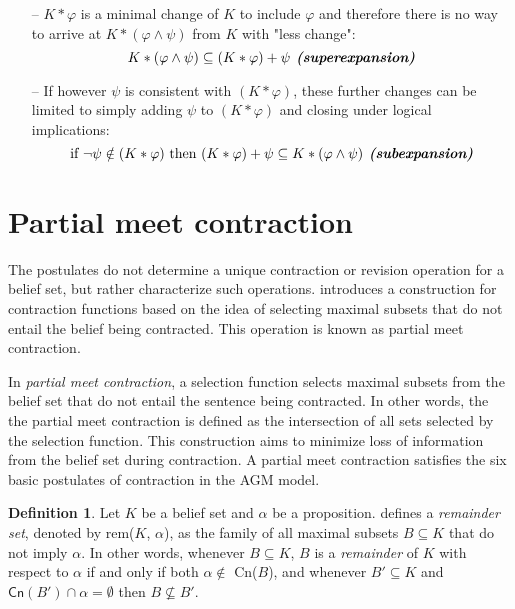\begin{enumerate}
    \item [--] $K * \varphi$ is a minimal change of $K$ to include $\varphi$ and therefore there is no way to arrive at $K * (\varphi \wedge \psi)$ from $K$ with "less change":
    $$K * (\varphi \wedge \psi) \subseteq (K * \varphi) + \psi \textbf{\textit{ (superexpansion)}}$$    
    
    \item [--] If however $\psi$ is consistent with $(K * \varphi)$, these further changes can be limited to simply adding $\psi$ to $(K * \varphi)$ and closing under logical implications:
    $$\text{if } \neg \psi \notin (K * \varphi) \text{ then } (K * \varphi) + \psi \subseteq K * (\varphi \wedge \psi) \textbf{\textit{ (subexpansion)}}$$

\end{enumerate}

\section{Partial meet contraction}

The postulates do not determine a unique contraction or revision operation for a belief set, but rather characterize such operations. \citet{AGM1985} introduces a construction for contraction functions based on the idea of selecting maximal subsets that do not entail the belief being contracted. This operation is known as partial meet contraction.

In \textit{partial meet contraction}, a selection function selects maximal subsets from the belief set that do not entail the sentence being contracted. In other words, the the partial meet contraction is defined as the intersection of all sets selected by the selection function. This construction aims to minimize loss of information from the belief set during contraction. A partial meet contraction satisfies the six basic postulates of contraction in the AGM model.

\theoremstyle{definition}
\newtheorem{definition}{Definition}[chapter]

\begin{definition}
    Let $K$ be a belief set and $\alpha$ be a proposition. \citet{AM1981} defines a \textit{remainder set}, denoted by \textsf{rem}($K$, $\alpha$), as the family of all maximal subsets $B \subseteq K$ that do not imply $\alpha$. In other words, whenever $B \subseteq K$, $B$ is a \textit{remainder} of $K$ with respect to $\alpha$ if and only if both $\alpha \notin$ \textsf{Cn}($B$), and whenever $B' \subseteq K$ and $\textsf{Cn}(B') \cap \alpha = \emptyset$ then $B \not \subseteq B'$.
\end{definition}


